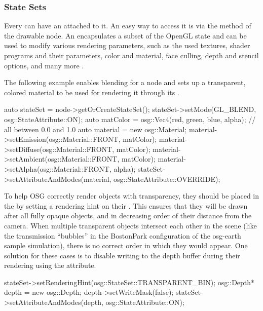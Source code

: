 \subsubsection{State Sets}
\label{sec:graphics:osg-state-sets}

Every  can have an  attached to it.
An easy way to access it is via the  method of the
drawable node. An  encapsulates a subset of the OpenGL
state and can be used to modify various rendering parameters, such as the used
textures, shader programs and their parameters, color and material, face
culling, depth and stencil options, and many more .

The following example enables blending for a node and sets up a transparent,
colored material to be used for rendering it through its .

\begin{cpp}
auto stateSet = node->getOrCreateStateSet();
stateSet->setMode(GL_BLEND, osg::StateAttribute::ON);
auto matColor = osg::Vec4(red, green, blue, alpha); // all between 0.0 and 1.0
auto material = new osg::Material;
material->setEmission(osg::Material::FRONT, matColor);
material->setDiffuse(osg::Material::FRONT, matColor);
material->setAmbient(osg::Material::FRONT, matColor);
material->setAlpha(osg::Material::FRONT, alpha);
stateSet->setAttributeAndModes(material, osg::StateAttribute::OVERRIDE);
\end{cpp}

To help OSG correctly render objects with transparency, they should be placed in the
 by setting a rendering hint on their
. This ensures that they will be drawn after all fully
opaque objects, and in decreasing order of their distance from the camera. When
multiple transparent objects intersect each other in the scene (like the
transmission ``bubbles'' in the BostonPark configuration of the osg-earth sample
simulation), there is no correct order in which they would appear. One solution
for these cases is to disable writing to the depth buffer during their rendering
using the  attribute.

\begin{cpp}
stateSet->setRenderingHint(osg::StateSet::TRANSPARENT_BIN);
osg::Depth* depth = new osg::Depth;
depth->setWriteMask(false);
stateSet->setAttributeAndModes(depth, osg::StateAttribute::ON);
\end{cpp}

